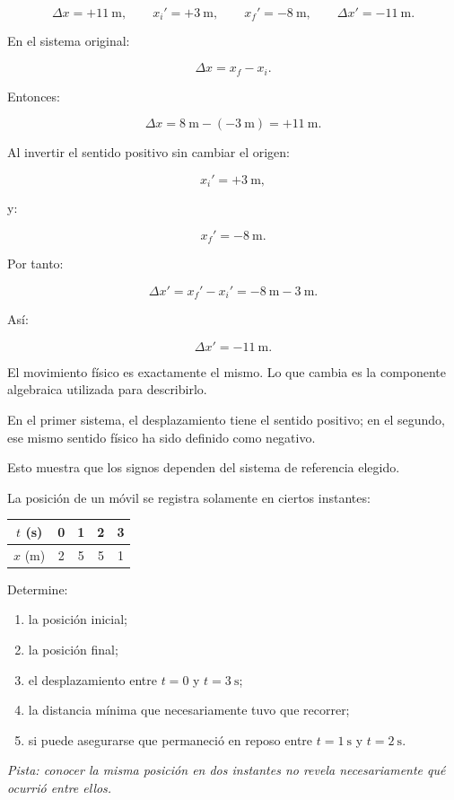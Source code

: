 \begin{respuesta}
\[
\Delta x=+\SI{11}{\meter},
\qquad
x_i'=+\SI{3}{\meter},
\qquad
x_f'=-\SI{8}{\meter},
\qquad
\Delta x'=-\SI{11}{\meter}.
\]
\end{respuesta}

\begin{explicacion}
En el sistema original:

\[
\Delta x=x_f-x_i.
\]

Entonces:

\[
\Delta x
=
\SI{8}{\meter}
-
(-\SI{3}{\meter})
=
+\SI{11}{\meter}.
\]

Al invertir el sentido positivo sin cambiar el origen:

\[
x_i'=+\SI{3}{\meter},
\]

y:

\[
x_f'=-\SI{8}{\meter}.
\]

Por tanto:

\[
\Delta x'
=
x_f'-x_i'
=
-\SI{8}{\meter}
-
\SI{3}{\meter}.
\]

Así:

\[ \boxed{\Delta x'=-\SI{11}{\meter}}. \]

El movimiento físico es exactamente el mismo. Lo que cambia es la componente algebraica utilizada para describirlo.

En el primer sistema, el desplazamiento tiene el sentido positivo; en el segundo, ese mismo sentido físico ha sido definido como negativo.

Esto muestra que los signos dependen del sistema de referencia elegido.
\end{explicacion}


\begin{ejercicio}
La posición de un móvil se registra solamente en ciertos instantes:

\begin{center}
\begin{tabular}{c|cccc}
\toprule
\(t\) (\si{\second}) & 0 & 1 & 2 & 3 \\
\midrule
\(x\) (\si{\meter}) & 2 & 5 & 5 & 1 \\
\bottomrule
\end{tabular}
\end{center}

Determine:

\begin{enumerate}[label=\alph*)]
    \item la posición inicial;
    \item la posición final;
    \item el desplazamiento entre \(t=0\) y \(t=\SI{3}{\second}\);
    \item la distancia mínima que necesariamente tuvo que recorrer;
    \item si puede asegurarse que permaneció en reposo entre \(t=\SI{1}{\second}\) y \(t=\SI{2}{\second}\).
\end{enumerate}

\textit{Pista: conocer la misma posición en dos instantes no revela necesariamente qué ocurrió entre ellos.}
\end{ejercicio}

